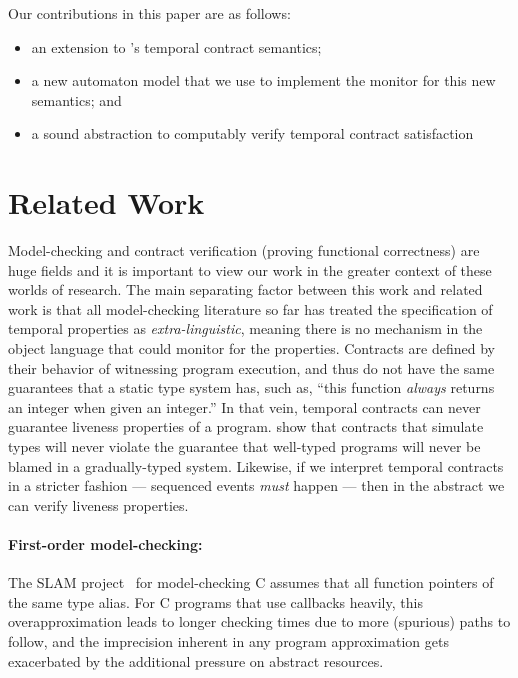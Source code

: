 \documentclass[preprint,onecolumn,9pt]{sigplanconf} %
\begin{document}
Our contributions in this paper are as follows:
\begin{itemize}
 \item{an extension to \citeauthor{ianjohnson:dfm:icfp2011}'s temporal contract semantics;}
 \item{a new automaton model that we use to implement the monitor for this new semantics; and}
 \item{a sound abstraction to computably verify temporal contract satisfaction}
\end{itemize}

\section{Related Work}

Model-checking and contract verification (proving functional correctness) are huge fields and it is important to view our work in the greater context of these worlds of research.
%
The main separating factor between this work and related work is that all model-checking literature so far has treated the specification of temporal properties as \emph{extra-linguistic}, meaning there is no mechanism in the object language that could monitor for the properties.
%
Contracts are defined by their behavior of witnessing program execution, and thus do not have the same guarantees that a static type system has, such as, ``this function \emph{always} returns an integer when given an integer.''
%
In that vein, temporal contracts can never guarantee liveness properties of a program.
%
\citet{ianjohnson:dthf:complete} show that contracts that simulate types will never violate the guarantee that well-typed programs will never be blamed in a gradually-typed system.
%
Likewise, if we interpret temporal contracts in a stricter fashion --- sequenced events \emph{must} happen --- then in the abstract we can verify liveness properties.

\paragraph{First-order model-checking:}
The SLAM project~\citep{ianjohnson:Ball:2002:SLP:503272.503274} for model-checking C assumes that all function pointers of the same type alias.
%
For C programs that use callbacks heavily, this overapproximation leads to longer checking times due to more (spurious) paths to follow, and the imprecision inherent in any program approximation gets exacerbated by the additional pressure on abstract resources.
\end{document}
